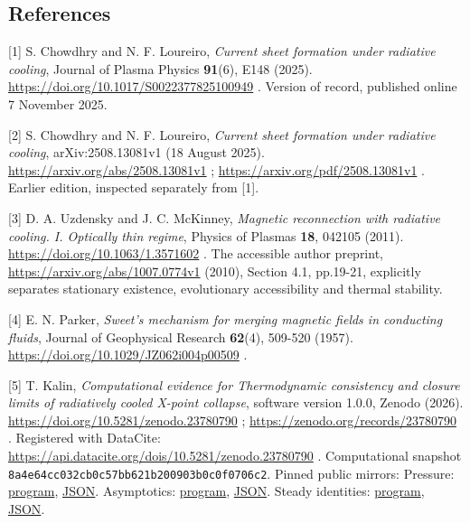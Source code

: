 \clearpage
\begingroup\small\raggedright
\subsection{References}\label{references}

{[}1{]} S. Chowdhry and N. F. Loureiro, \emph{Current sheet formation
under radiative cooling}, Journal of Plasma Physics \textbf{91}(6), E148
(2025). \url{https://doi.org/10.1017/S0022377825100949} . Version of
record, published online 7 November 2025.

{[}2{]} S. Chowdhry and N. F. Loureiro, \emph{Current sheet formation
under radiative cooling}, arXiv:2508.13081v1 (18 August 2025).
\url{https://arxiv.org/abs/2508.13081v1} ;
\url{https://arxiv.org/pdf/2508.13081v1} . Earlier edition, inspected
separately from {[}1{]}.

{[}3{]} D. A. Uzdensky and J. C. McKinney, \emph{Magnetic reconnection
with radiative cooling. I. Optically thin regime}, Physics of Plasmas
\textbf{18}, 042105 (2011). \url{https://doi.org/10.1063/1.3571602} .
The accessible author preprint, \url{https://arxiv.org/abs/1007.0774v1}
(2010), Section 4.1, pp.19-21, explicitly separates stationary
existence, evolutionary accessibility and thermal stability.

{[}4{]} E. N. Parker, \emph{Sweet's mechanism for merging magnetic
fields in conducting fluids}, Journal of Geophysical Research
\textbf{62}(4), 509-520 (1957).
\url{https://doi.org/10.1029/JZ062i004p00509} .

{[}5{]} T. Kalin, \emph{Computational evidence for Thermodynamic
consistency and closure limits of radiatively cooled X-point collapse},
software version 1.0.0, Zenodo (2026).
\url{https://doi.org/10.5281/zenodo.23780790} ;
\url{https://zenodo.org/records/23780790} . Registered with DataCite:
\url{https://api.datacite.org/dois/10.5281/zenodo.23780790} .
Computational snapshot
\nolinkurl{8a4e64cc032cb0c57bb621b200903b0c0f0706c2}. Pinned public
mirrors: Pressure:
\href{https://raw.githubusercontent.com/Teylersf/radiative-cooling-current-sheet-audit/8a4e64cc032cb0c57bb621b200903b0c0f0706c2/experiments/verify_pressure_independently.py}{program},
\href{https://raw.githubusercontent.com/Teylersf/radiative-cooling-current-sheet-audit/8a4e64cc032cb0c57bb621b200903b0c0f0706c2/results/independent-pressure.json}{JSON}.
Asymptotics:
\href{https://raw.githubusercontent.com/Teylersf/radiative-cooling-current-sheet-audit/8a4e64cc032cb0c57bb621b200903b0c0f0706c2/experiments/verify_asymptotics_independently.py}{program},
\href{https://raw.githubusercontent.com/Teylersf/radiative-cooling-current-sheet-audit/8a4e64cc032cb0c57bb621b200903b0c0f0706c2/results/independent-asymptotics.json}{JSON}.
Steady identities:
\href{https://raw.githubusercontent.com/Teylersf/radiative-cooling-current-sheet-audit/8a4e64cc032cb0c57bb621b200903b0c0f0706c2/experiments/verify_steady_state_independently.py}{program},
\href{https://raw.githubusercontent.com/Teylersf/radiative-cooling-current-sheet-audit/8a4e64cc032cb0c57bb621b200903b0c0f0706c2/results/independent-steady-state.json}{JSON}.

